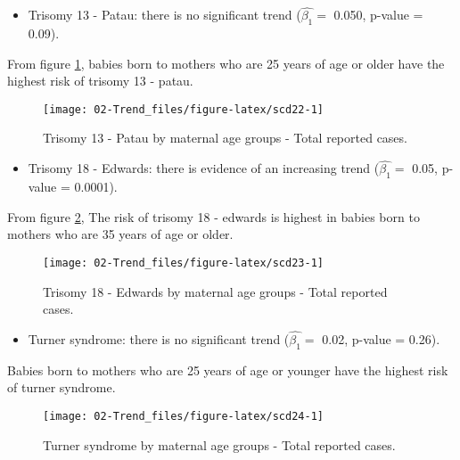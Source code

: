 \documentclass[
]{krantz}
\providecommand{\tightlist}{%
  \setlength{\itemsep}{0pt}\setlength{\parskip}{0pt}}
\begin{document}
\begin{itemize}
\tightlist
\item
  Trisomy 13 - Patau: there is no significant trend (\(\hat{\beta_{1}} =\) 0.050, p-value = 0.09).
\end{itemize}

From figure \ref{fig:scd22}, babies born to mothers who are 25 years of age or older have the highest risk of trisomy 13 - patau.

\begin{figure}[h]

{\centering \texttt{[image: 02-Trend\_files/figure-latex/scd22-1]} 

}

\caption{Trisomy 13 - Patau by maternal age groups - Total reported cases.}\label{fig:scd22}
\end{figure}

\begin{itemize}
\tightlist
\item
  Trisomy 18 - Edwards: there is evidence of an increasing trend (\(\hat{\beta_{1}} =\) 0.05, p-value = 0.0001).
\end{itemize}

From figure \ref{fig:scd23}, The risk of trisomy 18 - edwards is highest in babies born to mothers who are 35 years of age or older.

\begin{figure}[h]

{\centering \texttt{[image: 02-Trend\_files/figure-latex/scd23-1]} 

}

\caption{Trisomy 18 - Edwards by maternal age groups - Total reported cases.}\label{fig:scd23}
\end{figure}

\begin{itemize}
\tightlist
\item
  Turner syndrome: there is no significant trend (\(\hat{\beta_{1}} =\) 0.02, p-value = 0.26).
\end{itemize}

Babies born to mothers who are 25 years of age or younger have the highest risk of turner syndrome.

\begin{figure}[h]

{\centering \texttt{[image: 02-Trend\_files/figure-latex/scd24-1]} 

}

\caption{Turner syndrome by maternal age groups - Total reported cases.}\label{fig:scd24}
\end{figure}
\end{document}

